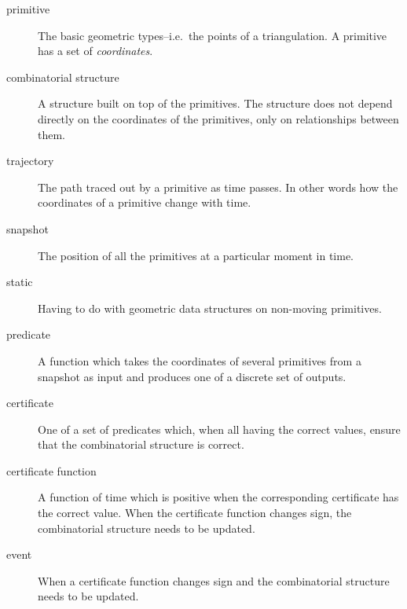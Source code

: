 \begin{description}
\item[primitive] The basic geometric types--i.e.\ the points of a
  triangulation. A primitive has a set of {\em coordinates}.
\item[combinatorial structure] A structure built on top of the
  primitives. The structure does not depend directly on the
  coordinates of the primitives, only on relationships between them.
\item[trajectory] The path traced out by a primitive as time passes.
  In other words how the coordinates of a primitive change with time.
\item[snapshot] The position of all the primitives at a particular
  moment in time.
\item[static] Having to do with geometric data structures on
  non-moving primitives.
\item[predicate] A function which takes the coordinates of several
  primitives from a snapshot as input and produces one of a discrete
  set of outputs.
\item[certificate] One of a set of predicates which, when all having
  the correct values, ensure that the combinatorial structure is
  correct.
\item[certificate function] A function of time which is positive when
  the corresponding certificate has the correct value. When the
  certificate function changes sign, the combinatorial structure needs
  to be updated.
\item[event] When a certificate function changes sign and the
  combinatorial structure needs to be updated.
\end{description}

